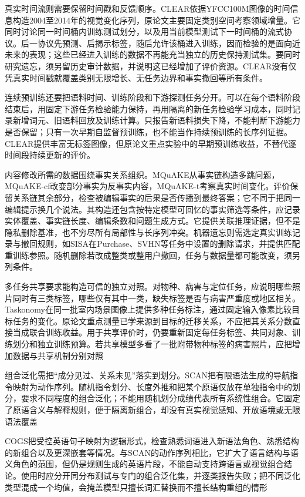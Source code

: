 真实时间流则需要保留时间戳和反馈顺序。CLEAR依据YFCC100M图像的时间信息构造2004至2014年的视觉变化序列，原论文主要固定类别空间考察领域增量。它同时讨论同一时间桶内训练测试划分，以及用当前模型测试下一时间桶的流式协议。后一协议先预测、后揭示标签，随后允许该桶进入训练，因而检验的是面向近未来的表现；这些已经进入训练的数据不再能充当独立的历史保持测试集。要同时研究遗忘，须另留历史审计数据，并说明这已经增加了评价资源。CLEAR没有仅凭真实时间戳就覆盖类别无限增长、无任务边界和事实撤回等所有条件。

连续预训练还要把语料时间、训练阶段和下游探测任务分开。可以在每个语料阶段结束后，用固定下游任务检验能力保持，再用隔离的新任务检验学习成本，同时记录新增词元、旧语料回放及训练计算。只报告新语料损失下降，不能判断下游能力是否保留；只有一次早期自监督预训练，也不能当作持续预训练的长序列证据。CLEAR提供丰富无标签图像，但原论文重点实验中的早期预训练收益，不替代逐时间段持续更新的评价。

内容修改所需的数据围绕事实关系组织。MQuAKE从事实链构造多跳问题，MQuAKE-cf改变部分事实为反事实内容，MQuAKE-t考察真实时间变化。评价保留关系链其余部分，检查被编辑事实的后果是否传播到最终答案；它不同于把同一编辑提示换几个说法。其构造还包含按特定模型可回忆的事实筛选等条件，应记录实体覆盖、事实链长度、编辑条数和问题生成方式。它提供关联推理证据，但不是隐私删除基准，也不穷尽所有局部性与长序列冲突。机器遗忘则需选定真实训练记录与撤回规则，如SISA在Purchase、SVHN等任务中设置的删除请求，并提供匹配重训练参照。随机删除若改成整类或整用户撤回，任务与数据量都可能改变，须另列条件。

多任务共享要求能构造可信的独立对照。对物种、病害与定位任务，应说明哪些照片同时有三类标签，哪些仅有其中一类，缺失标签是否与病害严重度或地区相关。Taskonomy在同一批室内场景图像上提供多种任务标注，通过固定输入像素比较目标任务的变化。原论文重点测量已学来源到目标的迁移关系，不应把其关系分数直接当成联合训练收益。用于共享评价时，仍要重新固定每任务标签、共同对象、训练划分和独立训练预算。若共享模型多看了一批附带物种标签的病害照片，应把增加数据与共享机制分别对照

组合泛化需把“成分见过、关系未见”落实到划分。SCAN把有限语法生成的导航指令映射为动作序列。随机指令划分、长度外推和把某个原语仅放在单独指令中的划分，要求不同程度的组合泛化；不能用随机划分成绩代表所有系统性组合。它固定了原语含义与解释规则，便于隔离新组合，却没有真实视觉感知、开放语境或无限语法覆盖

COGS把受控英语句子映射为逻辑形式，检查熟悉词语进入新语法角色、熟悉结构的新组合以及更深嵌套等情况。与SCAN的动作序列相比，它扩大了语言结构与语义角色的范围，但仍是规则生成的英语片段，不能自动支持跨语言或视觉组合结论。使用时应分开同分布测试与专门的组合泛化集，并逐类报告失败；把不同泛化类型混成一个均值，会掩盖模型只擅长词汇替换而不擅长结构重组的情形

